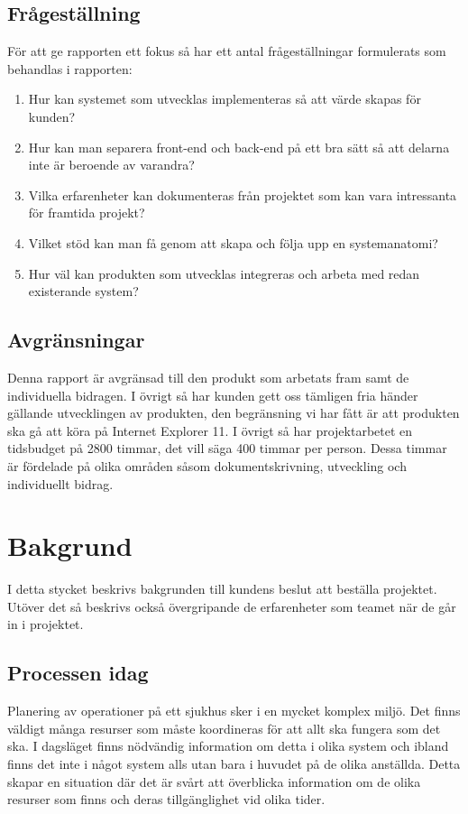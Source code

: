 \documentclass[a4paper,10pt]{article}
\begin{document}
\subsection{Frågeställning}
För att ge rapporten ett fokus så har ett antal frågeställningar formulerats som behandlas i rapporten:
\begin{enumerate}
	\item Hur kan systemet som utvecklas implementeras så att värde skapas för kunden?
	\item Hur kan man separera front-end och back-end på ett bra sätt så att delarna inte är beroende av varandra?
	\item Vilka erfarenheter kan dokumenteras från projektet som kan vara intressanta för framtida projekt?
	\item Vilket stöd kan man få genom att skapa och följa upp en systemanatomi?
	\item Hur väl kan produkten som utvecklas integreras och arbeta med redan existerande system?
\end{enumerate}

\subsection{Avgränsningar}
Denna rapport är avgränsad till den produkt som arbetats fram samt de individuella bidragen. I övrigt så har kunden gett oss tämligen fria händer gällande utvecklingen av produkten, den begränsning vi har fått är att produkten ska gå att köra på Internet Explorer 11.
I övrigt så har projektarbetet en tidsbudget på 2800 timmar, det vill säga 400 timmar per person. Dessa timmar är fördelade på olika områden såsom dokumentskrivning, utveckling och individuellt bidrag.

\newpage

\section{Bakgrund}
I detta stycket beskrivs bakgrunden till kundens beslut att beställa projektet.
Utöver det så beskrivs också övergripande de erfarenheter som teamet när de går
in i projektet.

\subsection{Processen idag}
Planering av operationer på ett sjukhus sker i en mycket komplex miljö. Det
finns väldigt många resurser som måste koordineras för att allt ska fungera som
det ska.
I dagsläget finns nödvändig information om detta i olika system och ibland finns
det inte i något system alls utan bara i huvudet på de olika anställda. Detta
skapar en situation där det är svårt att överblicka information om de olika
resurser som finns och deras tillgänglighet vid olika tider.
\end{document}
